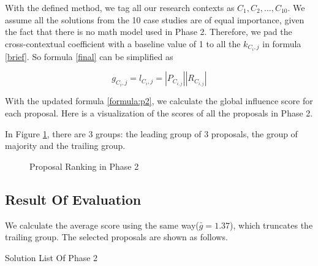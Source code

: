 With the defined method, we tag all our research contexts as $C_{1}, C_{2}, \ldots, C_{10}$. We assume all the solutions from the 10 case studies are of equal importance, given the fact that there is no math model used in Phase 2. Therefore, we pad the cross-contextual coefficient with a baseline value of 1 to all the $\mathit{k_{C_{i},j}}$ in formula \ref{brief}. So formula \ref{final} can be simplified as 

\begin{equation}
g_{C_{i},j} = l_{C_{i},j} = |P_{C_{i,j}}| |R_{C_{i,j}}|
\label{formula:p2}
\end{equation}

With the updated formula \ref{formula:p2}, we calculate the global influence score for each proposal. Here is a visualization of the scores of all the proposals in Phase 2.

In Figure \ref{fig:rankingp2}, there are 3 groups: the leading group of 3 proposals, the group of majority and the trailing group.
\begin{figure}[!ht]
\centering
\caption{Proposal Ranking in Phase 2}
\label{fig:rankingp2}
\end{figure}


\subsection{Result Of Evaluation}
We calculate the average score using the same way($\bar{g}=1.37$), which truncates the trailing group. The selected proposals are shown as follows.

\begin{table}[!ht]
\caption{Solution List Of Phase 2}
\begin{adjustbox}{width=1\textwidth}
\end{adjustbox}
\label{tab:solution2}
\end{table}
